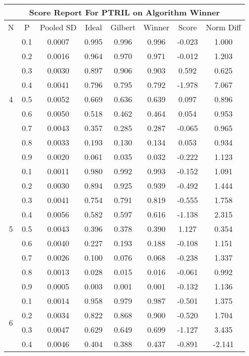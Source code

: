 \documentclass[11pt,a4paper]{report}
\begin{document}
\begin{longtable}{ | c | c || c | c | c | c | c | c | }
\hline
\multicolumn{8}{|c|}{ Score Report For PTRIL on Algorithm Winner} \\
\hline
N & P & Pooled SD &  Ideal &  Gilbert & Winner  & Score & Norm Diff \\
 \hline
 \hline
 \endhead
\multirow{9}{*}{4} & 0.1 & 0.0007 & 0.995 & 0.996 & 0.996 & -0.023 & 1.000 \\
 & 0.2 & 0.0016 & 0.964 & 0.970 & 0.971 & -0.012 & 1.203 \\
 & 0.3 & 0.0030 & 0.897 & 0.906 & 0.903 & 0.592 & 0.625 \\
 & 0.4 & 0.0041 & 0.796 & 0.795 & 0.792 & -1.978 & 7.067 \\
 & 0.5 & 0.0052 & 0.669 & 0.636 & 0.639 & 0.097 & 0.896 \\
 & 0.6 & 0.0050 & 0.518 & 0.462 & 0.464 & 0.054 & 0.953 \\
 & 0.7 & 0.0043 & 0.357 & 0.285 & 0.287 & -0.065 & 0.965 \\
 & 0.8 & 0.0033 & 0.193 & 0.130 & 0.134 & 0.053 & 0.934 \\
 & 0.9 & 0.0020 & 0.061 & 0.035 & 0.032 & -0.222 & 1.123 \\
 \hline
\multirow{9}{*}{5} & 0.1 & 0.0011 & 0.980 & 0.992 & 0.993 & -0.152 & 1.091 \\
 & 0.2 & 0.0030 & 0.894 & 0.925 & 0.939 & -0.492 & 1.444 \\
 & 0.3 & 0.0041 & 0.754 & 0.791 & 0.819 & -0.555 & 1.758 \\
 & 0.4 & 0.0056 & 0.582 & 0.597 & 0.616 & -1.138 & 2.315 \\
 & 0.5 & 0.0043 & 0.396 & 0.378 & 0.390 & 1.127 & 0.354 \\
 & 0.6 & 0.0040 & 0.227 & 0.193 & 0.188 & -0.108 & 1.151 \\
 & 0.7 & 0.0026 & 0.100 & 0.076 & 0.068 & -0.238 & 1.337 \\
 & 0.8 & 0.0013 & 0.028 & 0.015 & 0.016 & -0.061 & 0.992 \\
 & 0.9 & 0.0005 & 0.003 & 0.001 & 0.001 & -0.132 & 1.136 \\
 \hline
\multirow{9}{*}{6} & 0.1 & 0.0014 & 0.958 & 0.979 & 0.987 & -0.501 & 1.375 \\
 & 0.2 & 0.0034 & 0.822 & 0.868 & 0.900 & -0.520 & 1.704 \\
 & 0.3 & 0.0047 & 0.629 & 0.649 & 0.699 & -1.127 & 3.435 \\
 & 0.4 & 0.0046 & 0.404 & 0.388 & 0.437 & -0.891 & -2.141 \\

\end{longtable}
\end{document}
